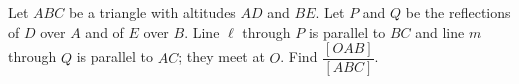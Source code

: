 Let $ABC$ be a triangle with altitudes $AD$ and $BE$. Let $P$ and $Q$ be the reflections of $D$ over $A$ and of $E$ over $B$. Line $\ell$ through $P$ is parallel to $BC$ and line $m$ through $Q$ is parallel to $AC$; they meet at $O$. Find $\dfrac{[OAB]}{[ABC]}$.
